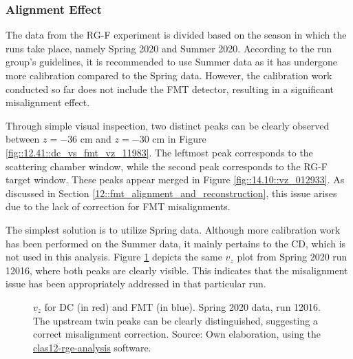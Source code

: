 \subsubsection{Alignment Effect}
\label{14.11::alignment_effect}
    The data from the RG-F experiment is divided based on the season in which the runs take place, namely Spring 2020 and Summer 2020.
    According to the run group's guidelines, it is recommended to use Summer data as it has undergone more calibration compared to the Spring data.
    However, the calibration work conducted so far does not include the FMT detector, resulting in a significant misalignment effect.

    Through simple visual inspection, two distinct peaks can be clearly observed between $z = -36$ cm and $z = -30$ cm in Figure \ref{fig::12.41::dc_vs_fmt_vz_11983}.
    The leftmost peak corresponds to the scattering chamber window, while the second peak corresponds to the RG-F target window.
    These peaks appear merged in Figure \ref{fig::14.10::vz_012933}.
    As discussed in Section \ref{12::fmt_alignment_and_reconstruction}, this issue arises due to the lack of correction for FMT misalignments.

    The simplest solution is to utilize Spring data.
    Although more calibration work has been performed on the Summer data, it mainly pertains to the CD, which is not used in this analysis.
    Figure \ref{fig::14.11::vz_012016} depicts the same $v_z$ plot from Spring 2020 run 12016, where both peaks are clearly visible.
    This indicates that the misalignment issue has been appropriately addressed in that particular run.

    \begin{figure}[t!]
        \centering{}
        \caption[$v_z$ for DC and FMT, run 12016]{$v_z$ for DC (in red) and FMT (in blue).
        Spring 2020 data, run 12016. The upstream twin peaks can be clearly distinguished, suggesting a correct misalignment correction.
        Source: Own elaboration, using the \hyperlink{github.com/bleaktwig/clas12-rge-analysis}{clas12-rge-analysis} software.}
        \label{fig::14.11::vz_012016}
    \end{figure}
